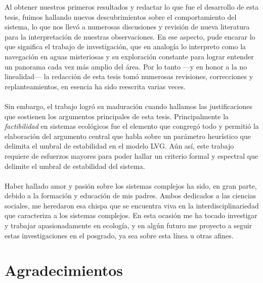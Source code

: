 \newline
Al obtener nuestros primeros resultados y redactar lo que fue el desarrollo de esta tesis, fuimos hallando nuevos descubrimientos sobre el comportamiento del sistema, lo que nos llevó a numerosas discusiones y revisión de nueva literatura para la interpretación de nuestras observaciones. En ese aspecto, pude encarar lo que significa el trabajo de investigación, que en analogía lo interpreto como la navegación en aguas misteriosas y su exploración constante para lograr entender un panorama cada vez más amplio del área. Por lo tanto ---y en honor a la no linealidad--- la redacción de esta tesis tomó numerosas revisiones, correcciones y replanteamientos, en esencia ha sido reescrita varias veces.\\
\\
Sin embargo, el trabajo logró su maduración cuando hallamos las justificaciones que sostienen los argumentos principales de esta tesis. Principalmente la \textit{factibilidad} en sistemas ecológicos fue el elemento que congregó todo y permitió la elaboración del argumento central que habla sobre un parámetro heurístico que delimita el umbral de estabilidad en el modelo LVG. Aún así, este trabajo requiere de esfuerzos mayores para poder hallar un criterio formal y espectral que delimite el umbral de estabilidad del sistema.\\
\\
Haber hallado amor y pasión sobre los sistemas complejos ha sido, en gran parte, debido a la formación y educación de mis padres. Ambos dedicados a las ciencias sociales, me heredaron esa chispa que se encuentra viva en la interdisciplinariedad que caracteriza a los sistemas complejos. En esta ocasión me ha tocado investigar y trabajar apasionadamente en ecología, y en algún futuro me proyecto a seguir estas investigaciones en el posgrado, ya sea sobre esta línea u otras afines.

\chapter{Agradecimientos}

